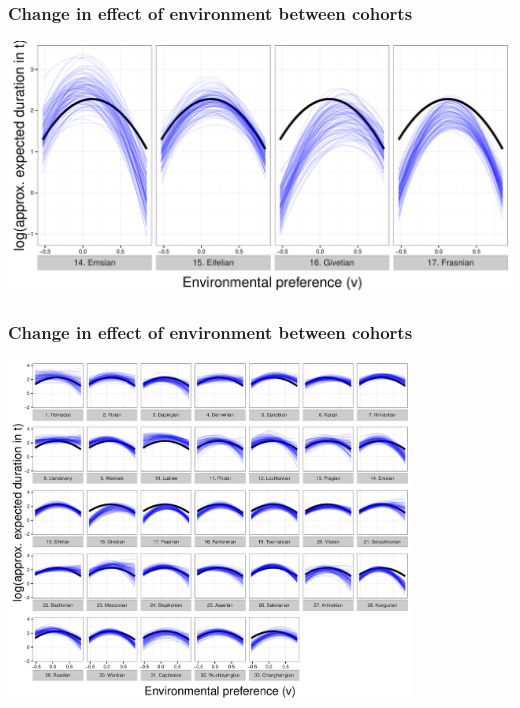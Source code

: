 \documentclass{beamer}
\begin{document}
\begin{frame}
  \frametitle{Change in effect of environment between cohorts}

  \begin{center}
    \includegraphics[width = \textwidth,height = 0.8\textheight,keepaspectratio = true]{figure/env_cohort_short}
  \end{center}
\end{frame}

\begin{frame}
  \frametitle{Change in effect of environment between cohorts}

  \begin{center}
    \includegraphics[width = 0.8\textwidth,height = 0.8\textheight,keepaspectratio = true]{figure/env_cohort_wide}
  \end{center}
\end{frame}
\end{document}
